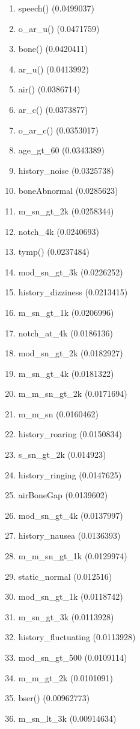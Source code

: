 \begin{enumerate}
\item speech() (0.0499037)
\item o\_ar\_u() (0.0471759)
\item bone() (0.0420411)
\item ar\_u() (0.0413992)
\item air() (0.0386714)
\item ar\_c() (0.0373877)
\item o\_ar\_c() (0.0353017)
\item age\_gt\_60 (0.0343389)
\item history\_noise (0.0325738)
\item boneAbnormal (0.0285623)
\item m\_sn\_gt\_2k (0.0258344)
\item notch\_4k (0.0240693)
\item tymp() (0.0237484)
\item mod\_sn\_gt\_3k (0.0226252)
\item history\_dizziness (0.0213415)
\item m\_sn\_gt\_1k (0.0206996)
\item notch\_at\_4k (0.0186136)
\item mod\_sn\_gt\_2k (0.0182927)
\item m\_sn\_gt\_4k (0.0181322)
\item m\_m\_sn\_gt\_2k (0.0171694)
\item m\_m\_sn (0.0160462)
\item history\_roaring (0.0150834)
\item s\_sn\_gt\_2k (0.014923)
\item history\_ringing (0.0147625)
\item airBoneGap (0.0139602)
\item mod\_sn\_gt\_4k (0.0137997)
\item history\_nausea (0.0136393)
\item m\_m\_sn\_gt\_1k (0.0129974)
\item static\_normal (0.012516)
\item mod\_sn\_gt\_1k (0.0118742)
\item m\_sn\_gt\_3k (0.0113928)
\item history\_fluctuating (0.0113928)
\item mod\_sn\_gt\_500 (0.0109114)
\item m\_m\_gt\_2k (0.0101091)
\item bser() (0.00962773)
\item m\_sn\_lt\_3k (0.00914634)

\end{enumerate}
